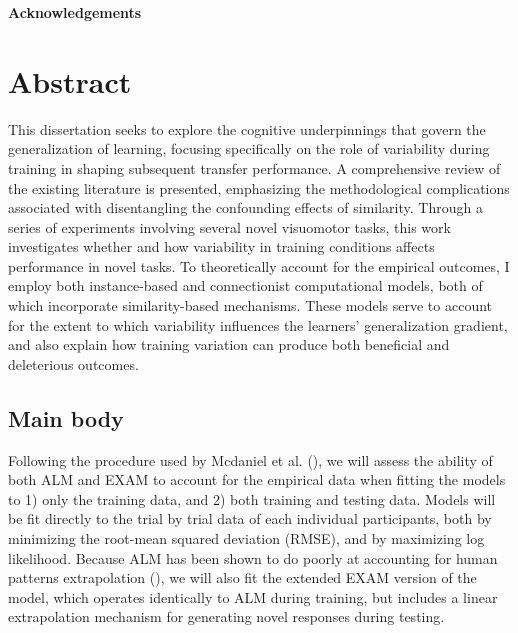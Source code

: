\documentclass[
  letterpaper,
  DIV=11,
  numbers=noendperiod]{scrartcl}
\begin{document}
\newpage
\begin{center}
\textbf{Acknowledgements}
\end{center}
\newpage

\newpage{}

\section{Abstract}\label{abstract}

This dissertation seeks to explore the cognitive underpinnings that
govern the generalization of learning, focusing specifically on the role
of variability during training in shaping subsequent transfer
performance. A comprehensive review of the existing literature is
presented, emphasizing the methodological complications associated with
disentangling the confounding effects of similarity. Through a series of
experiments involving several novel visuomotor tasks, this work
investigates whether and how variability in training conditions affects
performance in novel tasks. To theoretically account for the empirical
outcomes, I employ both instance-based and connectionist computational
models, both of which incorporate similarity-based mechanisms. These
models serve to account for the extent to which variability influences
the learners' generalization gradient, and also explain how training
variation can produce both beneficial and deleterious outcomes.

\newpage{}

\tableofcontents
\newpage
\listoffigures
\newpage
\listoftables
\newpage

\newpage{}

\subsection{Main body}\label{main-body}

Following the procedure used by Mcdaniel et al.
(), we
will assess the ability of both ALM and EXAM to account for the
empirical data when fitting the models to 1) only the training data, and
2) both training and testing data. Models will be fit directly to the
trial by trial data of each individual participants, both by minimizing
the root-mean squared deviation (RMSE), and by maximizing log
likelihood. Because ALM has been shown to do poorly at accounting for
human patterns extrapolation
(), we
will also fit the extended EXAM version of the model, which operates
identically to ALM during training, but includes a linear extrapolation
mechanism for generating novel responses during testing.
\end{document}
